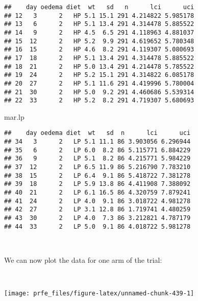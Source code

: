 \documentclass[
  12pt,
  a4paper]{book}
\newenvironment{Shaded}{\begin{snugshade}}{\end{snugshade}}
\newcommand{\AttributeTok}[1]{\textcolor[rgb]{0.77,0.63,0.00}{#1}}
\newcommand{\FunctionTok}[1]{\textcolor[rgb]{0.00,0.00,0.00}{#1}}
\newcommand{\NormalTok}[1]{#1}
\newcommand{\SpecialCharTok}[1]{\textcolor[rgb]{0.00,0.00,0.00}{#1}}
\newcommand{\StringTok}[1]{\textcolor[rgb]{0.31,0.60,0.02}{#1}}
\begin{document}
\begin{verbatim}
##    day oedema diet  wt   sd   n      lci      uci
## 12   3      2   HP 5.1 15.1 291 4.214822 5.985178
## 13   6      2   HP 5.1 13.4 291 4.314478 5.885522
## 14   9      2   HP 4.5  6.5 291 4.118963 4.881037
## 15  12      2   HP 5.2  9.9 291 4.619652 5.780348
## 16  15      2   HP 4.6  8.2 291 4.119307 5.080693
## 17  18      2   HP 5.1 13.4 291 4.314478 5.885522
## 18  21      2   HP 5.0 13.4 291 4.214478 5.785522
## 19  24      2   HP 5.2 15.1 291 4.314822 6.085178
## 20  27      2   HP 5.1 11.6 291 4.419996 5.780004
## 21  30      2   HP 5.0  9.2 291 4.460686 5.539314
## 22  33      2   HP 5.2  8.2 291 4.719307 5.680693
\end{verbatim}

\begin{Shaded}
\begin{Highlighting}[]
\NormalTok{mar.lp}
\end{Highlighting}
\end{Shaded}

\begin{verbatim}
##    day oedema diet  wt   sd  n      lci      uci
## 34   3      2   LP 5.1 11.1 86 3.903056 6.296944
## 35   6      2   LP 6.0  8.2 86 5.115771 6.884229
## 36   9      2   LP 5.1  8.2 86 4.215771 5.984229
## 37  12      2   LP 6.5 11.9 86 5.216790 7.783210
## 38  15      2   LP 6.4  9.1 86 5.418722 7.381278
## 39  18      2   LP 5.9 13.8 86 4.411908 7.388092
## 40  21      2   LP 6.1 16.5 86 4.320759 7.879241
## 41  24      2   LP 4.0  9.1 86 3.018722 4.981278
## 42  27      2   LP 3.1 12.8 86 1.719741 4.480259
## 43  30      2   LP 4.0  7.3 86 3.212821 4.787179
## 44  33      2   LP 5.0  9.1 86 4.018722 5.981278
\end{verbatim}

~

We can now plot the data for one arm of the trial:

~

\begin{Shaded}
\end{Shaded}

\begin{center}\texttt{[image: prfe\_files/figure-latex/unnamed-chunk-439-1]} \end{center}
\end{document}
